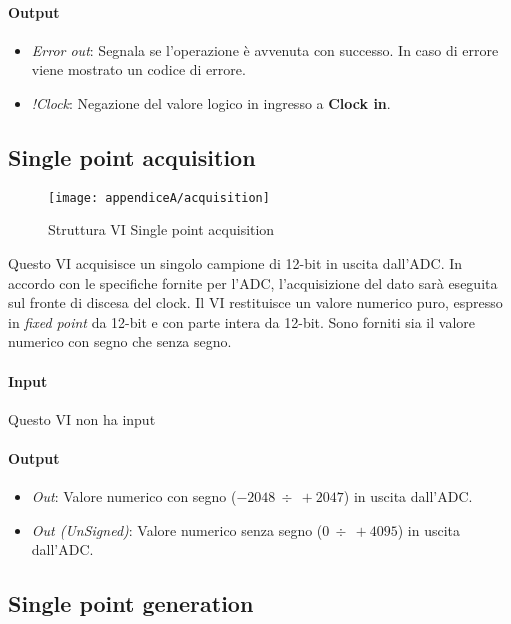 \paragraph*{Output}
\begin{itemize}
	\item \textit{Error out}: Segnala se l'operazione è avvenuta con successo. In caso di errore viene mostrato un codice di errore.
	\item \textit{!Clock}: Negazione del valore logico in ingresso a \textbf{Clock in}.
\end{itemize}

\subsection*{Single point acquisition}

\begin{figure}[H]  
	\begin{center}
		\texttt{[image: appendiceA/acquisition]}
		\caption{Struttura VI Single point acquisition}
	\end{center}
\end{figure}

Questo VI acquisisce un singolo campione di 12-bit in uscita dall'ADC. In accordo con le specifiche fornite per l'ADC, l'acquisizione del dato sarà eseguita sul fronte di discesa del clock.
Il VI restituisce un valore numerico puro, espresso in \textit{fixed point} da 12-bit e con parte intera da 12-bit. Sono forniti sia il valore numerico con segno che senza segno.

\paragraph*{Input}
Questo VI non ha input

\paragraph*{Output}
\begin{itemize}
	\item \textit{Out}: Valore numerico con segno ($-2048 \ \div \ +2047$) in uscita dall'ADC.
	\item \textit{Out (UnSigned)}: Valore numerico senza segno ($0 \ \div \ +4095$) in uscita dall'ADC.
\end{itemize}

\subsection*{Single point generation}

